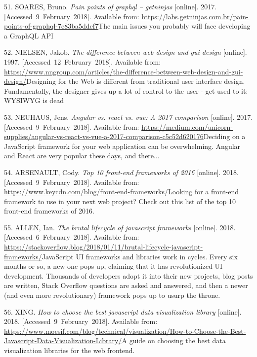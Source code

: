 \documentclass[american,a4paper,oneside,,tablecaptionabove]{scrbook}
\begin{document}
\hypertarget{ref-Soares.2017}{}
51. SOARES, Bruno. \emph{Pain points of graphql -- getninjas}
{[}online{]}. 2017. {[}Accessed~9~February~2018{]}. Available from:
\url{https://labs.getninjas.com.br/pain-points-of-graphql-7e83ba5ddef7}The
main issues you probably will face developing a GraphQL API

\hypertarget{ref-Nielsen.1997}{}
52. NIELSEN, Jakob. \emph{The difference between web design and gui
design} {[}online{]}. 1997. {[}Accessed~12~February~2018{]}. Available
from:
\url{https://www.nngroup.com/articles/the-difference-between-web-design-and-gui-design/}Designing
for the Web is different from traditional user interface design.
Fundamentally, the designer gives up a lot of control to the user - get
used to it: WYSIWYG is dead

\hypertarget{ref-Neuhaus.2017}{}
53. NEUHAUS, Jens. \emph{Angular vs. react vs. vue: A 2017 comparison}
{[}online{]}. 2017. {[}Accessed~9~February~2018{]}. Available from:
\url{https://medium.com/unicorn-supplies/angular-vs-react-vs-vue-a-2017-comparison-c5c52d620176}Deciding
on a JavaScript framework for your web application can be overwhelming.
Angular and React are very popular these days, and there\(\ldots\)

\hypertarget{ref-Arsenault.2018}{}
54. ARSENAULT, Cody. \emph{Top 10 front-end frameworks of 2016}
{[}online{]}. 2018. {[}Accessed~9~February~2018{]}. Available from:
\url{https://www.keycdn.com/blog/front-end-frameworks/}Looking for a
front-end framework to use in your next web project? Check out this list
of the top 10 front-end frameworks of 2016.

\hypertarget{ref-Allen.2018}{}
55. ALLEN, Ian. \emph{The brutal lifecycle of javascript frameworks}
{[}online{]}. 2018. {[}Accessed~6~February~2018{]}. Available from:
\url{https://stackoverflow.blog/2018/01/11/brutal-lifecycle-javascript-frameworks/}JavaScript
UI frameworks and libraries work in cycles. Every six months or so, a
new one pops up, claiming that it has revolutionized UI development.
Thousands of developers adopt it into their new projects, blog posts are
written, Stack Overflow questions are asked and answered, and then a
newer (and even more revolutionary) framework pops up to usurp the
throne.

\hypertarget{ref-Xing.2018}{}
56. XING. \emph{How to choose the best javascript data visualization
library} {[}online{]}. 2018. {[}Accessed~9~February~2018{]}. Available
from:
\url{https://www.moesif.com/blog/technical/visualization/How-to-Choose-the-Best-Javascript-Data-Visualization-Library/}A
guide on choosing the best data visualization libraries for the web
frontend.
\end{document}
